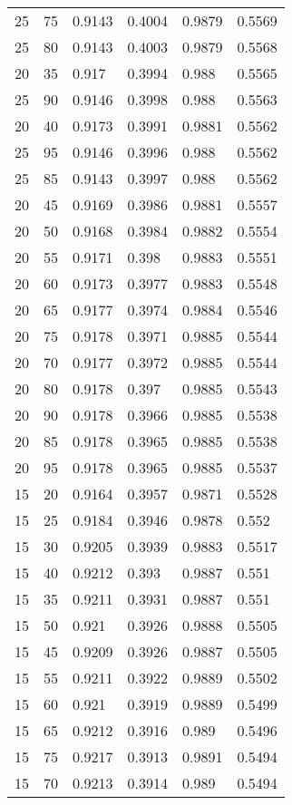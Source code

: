 \begin{center}
\begin{longtable}{|l|l|l|l|l|l|}
25 & 75 & 0.9143 & 0.4004 & 0.9879 & 0.5569 \\
25 & 80 & 0.9143 & 0.4003 & 0.9879 & 0.5568 \\
20 & 35 & 0.917  & 0.3994 & 0.988  & 0.5565 \\
25 & 90 & 0.9146 & 0.3998 & 0.988  & 0.5563 \\
20 & 40 & 0.9173 & 0.3991 & 0.9881 & 0.5562 \\
25 & 95 & 0.9146 & 0.3996 & 0.988  & 0.5562 \\
25 & 85 & 0.9143 & 0.3997 & 0.988  & 0.5562 \\
20 & 45 & 0.9169 & 0.3986 & 0.9881 & 0.5557 \\
20 & 50 & 0.9168 & 0.3984 & 0.9882 & 0.5554 \\
20 & 55 & 0.9171 & 0.398  & 0.9883 & 0.5551 \\
20 & 60 & 0.9173 & 0.3977 & 0.9883 & 0.5548 \\
20 & 65 & 0.9177 & 0.3974 & 0.9884 & 0.5546 \\
20 & 75 & 0.9178 & 0.3971 & 0.9885 & 0.5544 \\
20 & 70 & 0.9177 & 0.3972 & 0.9885 & 0.5544 \\
20 & 80 & 0.9178 & 0.397  & 0.9885 & 0.5543 \\
20 & 90 & 0.9178 & 0.3966 & 0.9885 & 0.5538 \\
20 & 85 & 0.9178 & 0.3965 & 0.9885 & 0.5538 \\
20 & 95 & 0.9178 & 0.3965 & 0.9885 & 0.5537 \\
15 & 20 & 0.9164 & 0.3957 & 0.9871 & 0.5528 \\
15 & 25 & 0.9184 & 0.3946 & 0.9878 & 0.552  \\
15 & 30 & 0.9205 & 0.3939 & 0.9883 & 0.5517 \\
15 & 40 & 0.9212 & 0.393  & 0.9887 & 0.551  \\
15 & 35 & 0.9211 & 0.3931 & 0.9887 & 0.551  \\
15 & 50 & 0.921  & 0.3926 & 0.9888 & 0.5505 \\
15 & 45 & 0.9209 & 0.3926 & 0.9887 & 0.5505 \\
15 & 55 & 0.9211 & 0.3922 & 0.9889 & 0.5502 \\
15 & 60 & 0.921  & 0.3919 & 0.9889 & 0.5499 \\
15 & 65 & 0.9212 & 0.3916 & 0.989  & 0.5496 \\
15 & 75 & 0.9217 & 0.3913 & 0.9891 & 0.5494 \\
15 & 70 & 0.9213 & 0.3914 & 0.989  & 0.5494 \\

\end{longtable}
\end{center}
